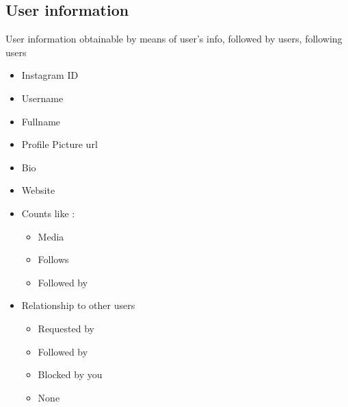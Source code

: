\documentclass{article}
\begin{document}
\subsection{User information}\label{userInfo}
User information obtainable by means of user's info, followed by users, following users
\begin{itemize}
	\item Instagram ID
	\item Username
	\item Fullname
	\item Profile Picture url
	\item Bio
	\item Website
	\item Counts like :
	\begin{itemize}
		\item Media 
		\item Follows 
		\item Followed by
	\end{itemize}
	\item Relationship to other users
	\begin{itemize}
		\item Requested by
		\item Followed by
		\item Blocked by you
		\item None
	\end{itemize}
\end{itemize}
\end{document}
